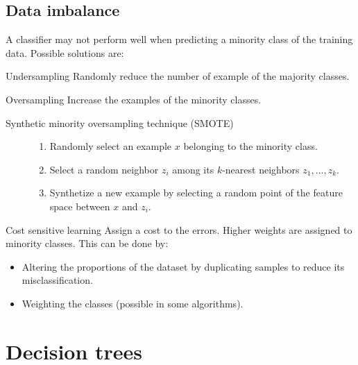 \subsection{Data imbalance}
A classifier may not perform well when predicting a minority class of the training data.
Possible solutions are:
\begin{descriptionlist}
    \item[Undersampling] 
        Randomly reduce the number of example of the majority classes.

    \item[Oversampling] 
        Increase the examples of the minority classes.

        \begin{description}
            \item[Synthetic minority oversampling technique (SMOTE)] 
                \begin{enumerate}
                    \item Randomly select an example $x$ belonging to the minority class.
                    \item Select a random neighbor $z_i$ among its $k$-nearest neighbors $z_1, \dots, z_k$.
                    \item Synthetize a new example by selecting a random point of the feature space between $x$ and $z_i$.
                \end{enumerate}
        \end{description}

    \item[Cost sensitive learning] 
        Assign a cost to the errors. Higher weights are assigned to minority classes.
        This can be done by:
        \begin{itemize}
            \item Altering the proportions of the dataset by duplicating samples to reduce its misclassification.
            \item Weighting the classes (possible in some algorithms).
        \end{itemize}
\end{descriptionlist}



\section{Decision trees}


